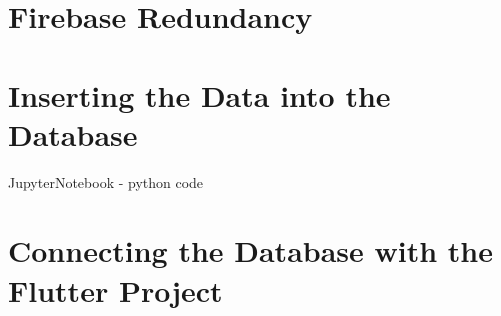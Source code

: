 \section{Firebase Redundancy}
\section{Inserting the Data into the Database}
JupyterNotebook - python code
\section{Connecting the Database with the Flutter Project}
